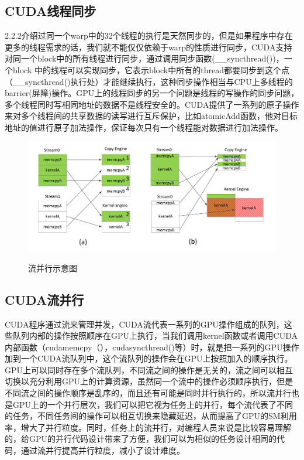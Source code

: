 \subsection{CUDA线程同步}
2.2.2介绍过同一个warp中的32个线程的执行是天然同步的，但是如果程序中存在更多的线程需求的话，我们就不能仅仅依赖于warp的性质进行同步，CUDA支持对同一个block中的所有线程进行同步，通过调用同步函数(\_\_syncthread())，一个block 中的线程可以实现同步，它表示block中所有的thread都要同步到这个点（\_\_syncthread()执行处）才能继续执行，这种同步操作相当与CPU上多线程的barrier(屏障)操作。GPU上的线程同步的另一个问题是线程的写操作的同步问题，多个线程同时写相同地址的数据不是线程安全的。CUDA提供了一系列的原子操作来对多个线程间的共享数据的读写进行互斥保护，比如atomicAdd函数，他对目标地址的值进行原子加法操作，保证每次只有一个线程能对数据进行加法操作。
\begin{figure}
\setlength{\abovecaptionskip}{-0.5cm}
\begin{center}
{\includegraphics[width=1 \textwidth]{figures/flow.pdf}}
\end{center}
\caption{{\footnotesize{流并行示意图}}}
\label{flow}
\end{figure}
\subsection{CUDA流并行}
CUDA程序通过流来管理并发，CUDA流代表一系列的GPU操作组成的队列，这些队列内部的操作按照顺序在GPU上执行，当我们调用kernel函数或者调用CUDA内部函数（cudamemcpy（），cudasyncthread()等）时，就是把一系列的GPU操作加到一个CUDA流队列中，这个流队列的操作会在GPU上按照加入的顺序执行。GPU上可以同时存在多个流队列，不同流之间的操作是无关的，流之间可以相互切换以充分利用GPU上的计算资源，虽然同一个流中的操作必须顺序执行，但是不同流之间的操作顺序是乱序的，而且还有可能是同时并行执行的，所以流并行也是GPU上的一个并行层次，我们可以把它视为任务上的并行，每个流代表了不同的任务，不同任务间的操作可以相互切换来隐藏延迟，从而提高了GPU的SM利用率，增大了并行粒度。同时，任务上的流并行，对编程人员来说是比较容易理解的，给GPU的并行代码设计带来了方便，我们可以为相似的任务设计相同的代码，通过流并行提高并行粒度，减小了设计难度。

